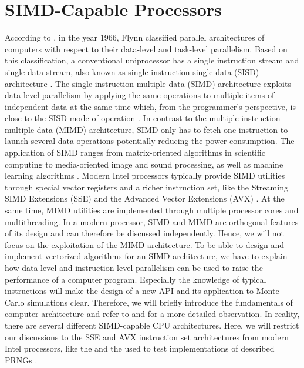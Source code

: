 \documentclass{stdlocal}
\begin{document}
\section{SIMD-Capable Processors} %
\label{sub:simd-capable_processors}

  According to \textcite[\ppno~10-11]{hennessy2019}, in the year 1966, Flynn classified parallel architectures of computers with respect to their data-level and task-level parallelism.
  Based on this classification, a conventional uniprocessor has a single instruction stream and single data stream, also known as single instruction single data (SISD) architecture \autocite[\ppno~509-510]{patterson2014}.
  The single instruction multiple data (SIMD) architecture exploits data-level parallelism by applying the same operations to multiple items of independent data at the same time \autocite{hennessy2019} which, from the programmer's perspective, is close to the SISD mode of operation \autocite{patterson2014}.
  In contrast to the multiple instruction multiple data (MIMD) architecture, SIMD only has to fetch one instruction to launch several data operations potentially reducing the power consumption.
  The application of SIMD ranges from matrix-oriented algorithms in scientific computing to media-oriented image and sound processing, as well as machine learning algorithms \autocite[\ppno~10-11]{hennessy2019}.
  Modern Intel processors typically provide SIMD utilities through special vector registers and a richer instruction set, like the Streaming SIMD Extensions (SSE) and the Advanced Vector Extensions (AVX) \autocite{intel-intrinsics-guide,fog2019a,fog2019b,fog2019c,fog2019d,fog2019e}.
  At the same time, MIMD utilities are implemented through multiple processor cores and multithreading.
  In a modern processor, SIMD and MIMD are orthogonal features of its design and can therefore be discussed independently.
  Hence, we will not focus on the exploitation of the MIMD architecture.
  To be able to design and implement vectorized algorithms for an SIMD architecture, we have to explain how data-level and instruction-level parallelism can be used to raise the performance of a computer program.
  Especially the knowledge of typical instructions will make the design of a new API and its application to Monte Carlo simulations clear.
  Therefore, we will briefly introduce the fundamentals of computer architecture and refer to \textcite{patterson2014} and \textcite{hennessy2019} for a more detailed observation.
  In reality, there are several different SIMD-capable CPU architectures.
  Here, we will restrict our discussions to the SSE and AVX instruction set architectures from modern Intel processors, like the  and the  used to test implementations of described PRNGs \autocite{intel-kaby-lake-i5,intel-kaby-lake-i7}.
\end{document}

